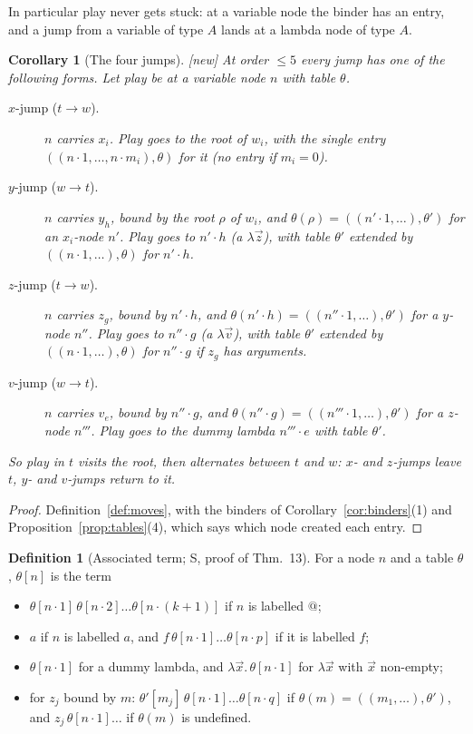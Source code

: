 \documentclass[11pt]{article}
\newcommand{\suc}[2]{#1{\cdot}#2}
\newcommand{\New}{\textsf{[new]}}
\theoremstyle{plain}
\newtheorem{corollary}[theorem]{Corollary}
\theoremstyle{definition}
\newtheorem{definition}[theorem]{Definition}
\theoremstyle{remark}
\begin{document}
In particular play never gets stuck: at a variable node the binder has
an entry, and a jump from a variable of type $A$ lands at a lambda node
of type $A$.

\begin{corollary}[The four jumps]\label{cor:jumps}
\New{} At order $\le5$ every jump has one of the following forms.  Let
play be at a variable node $n$ with table $\theta$.
\begin{description}
\item[$x$-jump ($t\to w$).] $n$ carries $x_i$.  Play goes to the root of
  $w_i$, with the single entry $((\suc n1,\dots,\suc n{m_i}),\theta)$
  for it (no entry if $m_i=0$).
\item[$y$-jump ($w\to t$).] $n$ carries $y_h$, bound by the root $\rho$
  of $w_i$, and $\theta(\rho)=((\suc{n'}1,\dots),\theta')$ for an
  $x_i$-node $n'$.  Play goes to $\suc{n'}h$ (a $\lambda\vec z$), with
  table $\theta'$ extended by $((\suc n1,\dots),\theta)$ for
  $\suc{n'}h$.
\item[$z$-jump ($t\to w$).] $n$ carries $z_g$, bound by $\suc{n'}h$, and
  $\theta(\suc{n'}h)=((\suc{n''}1,\dots),\theta')$ for a $y$-node
  $n''$.  Play goes to $\suc{n''}g$ (a $\lambda\vec v$), with table
  $\theta'$ extended by $((\suc n1,\dots),\theta)$ for $\suc{n''}g$
  if $z_g$ has arguments.
\item[$v$-jump ($w\to t$).] $n$ carries $v_e$, bound by $\suc{n''}g$, and
  $\theta(\suc{n''}g)=((\suc{n'''}1,\dots),\theta')$ for a $z$-node
  $n'''$.  Play goes to the dummy lambda $\suc{n'''}e$ with table
  $\theta'$.
\end{description}
So play in $t$ visits the root, then alternates between $t$ and $w$:
$x$- and $z$-jumps leave $t$, $y$- and $v$-jumps return to it.
\end{corollary}
\begin{proof}
Definition~\ref{def:moves}, with the binders of
Corollary~\ref{cor:binders}(1) and Proposition~\ref{prop:tables}(4),
which says which node created each entry.
\end{proof}

\begin{definition}[Associated term; S, proof of Thm.~13]\label{def:assoc}
For a node $n$ and a table $\theta$, $\theta[n]$ is the term
\begin{itemize}
\item $\theta[\suc n1]\,\theta[\suc n2]\dots\theta[\suc n{(k+1)}]$ if $n$ is
  labelled $@$;
\item $a$ if $n$ is labelled $a$, and $f\,\theta[\suc n1]\dots\theta[\suc np]$
  if it is labelled $f$;
\item $\theta[\suc n1]$ for a dummy lambda, and
  $\lambda\vec x.\,\theta[\suc n1]$ for $\lambda\vec x$ with $\vec x$
  non-empty;
\item for $z_j$ bound by $m$: $\theta'[m_j]\,\theta[\suc n1]\dots\theta[\suc nq]$
  if $\theta(m)=((m_1,\dots),\theta')$, and $z_j\,\theta[\suc n1]\dots$
  if $\theta(m)$ is undefined.
\end{itemize}
\end{definition}
\end{document}
